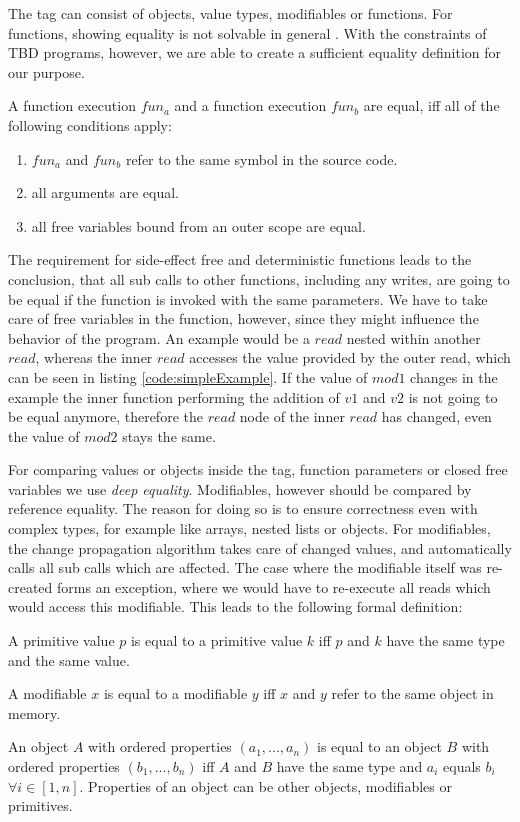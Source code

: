The tag can consist of objects, value types, modifiables or functions. For functions, showing equality is not solvable in general \cite{church1936note}. With the constraints of TBD programs, however, we are able to create a sufficient equality definition for our purpose.
\begin{definition}
\label{def:fun_equality}
A function execution $fun_a$ and a function execution $fun_b$ are equal, iff all of the following conditions apply: 
\begin{enumerate}
\item $fun_a$ and $fun_b$ refer to the same symbol in the source code. 
\item all arguments are equal.
\item all free variables bound from an outer scope are equal. 
\end{enumerate}
\end{definition}

The requirement for side-effect free and deterministic functions leads to the conclusion, that all sub calls to other functions, including any writes, are going to be equal if the function is invoked with the same parameters. We have to take care of free variables in the function, however, since they might influence the behavior of the program. An example would be a $read$ nested within another $read$, whereas the inner $read$ accesses the value provided by the outer read, which can be seen in listing \ref{code:simpleExample}. If the value of $mod1$ changes in the example the inner function performing the addition of $v1$ and $v2$ is not going to be equal anymore, therefore the $read$ node of the inner $read$ has changed, even the value of $mod2$ stays the same. 

For comparing values or objects inside the tag, function parameters or closed free variables we use \textit{deep equality}. Modifiables, however should be compared by reference equality. The reason for doing so is to ensure correctness even with complex types, for example like arrays, nested lists or objects. For modifiables, the change propagation algorithm takes care of changed values, and automatically calls all sub calls which are affected. The case where the modifiable itself was re-created forms an exception, where we would have to re-execute all reads which would access this modifiable. This leads to the following formal definition: 

\begin{definition}
A primitive value $p$ is equal to a primitive value $k$ iff $p$ and $k$ have the same type and the same value. 

A modifiable $x$ is equal to a modifiable $y$ iff $x$ and $y$ refer to the same object in memory.

An object $A$ with ordered properties $(a_1, ..., a_n)$ is equal to an object $B$ with ordered properties  $(b_1, ..., b_n)$ iff $A$ and $B$ have the same type and $a_i$ equals $b_i$ $\forall i \in[1, n]$. Properties of an object can be other objects, modifiables or primitives. 
\end{definition}

